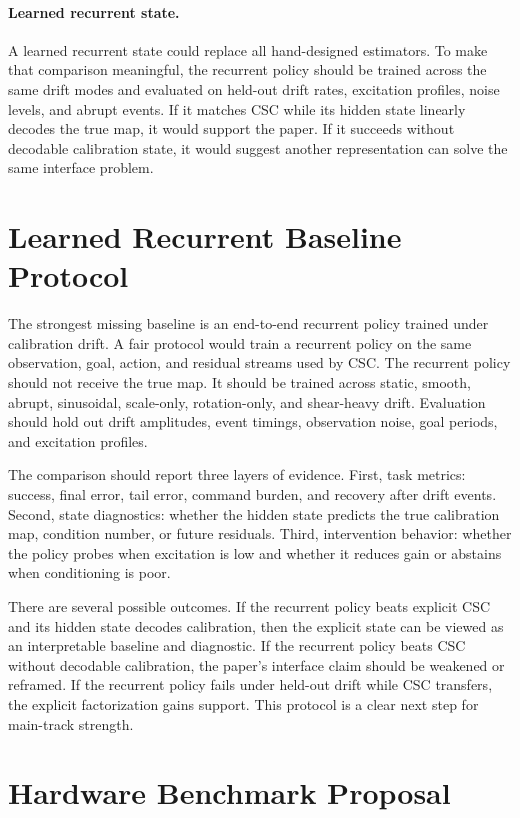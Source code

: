 \documentclass{article}
\begin{document}
\paragraph{Learned recurrent state.}
A learned recurrent state could replace all hand-designed estimators. To make
that comparison meaningful, the recurrent policy should be trained across the
same drift modes and evaluated on held-out drift rates, excitation profiles,
noise levels, and abrupt events. If it matches CSC while its hidden state
linearly decodes the true map, it would support the paper. If it succeeds
without decodable calibration state, it would suggest another representation
can solve the same interface problem.

\section{Learned Recurrent Baseline Protocol}

The strongest missing baseline is an end-to-end recurrent policy trained under
calibration drift. A fair protocol would train a recurrent policy on the same
observation, goal, action, and residual streams used by CSC. The recurrent
policy should not receive the true map. It should be trained across static,
smooth, abrupt, sinusoidal, scale-only, rotation-only, and shear-heavy drift.
Evaluation should hold out drift amplitudes, event timings, observation noise,
goal periods, and excitation profiles.

The comparison should report three layers of evidence. First, task metrics:
success, final error, tail error, command burden, and recovery after drift
events. Second, state diagnostics: whether the hidden state predicts the true
calibration map, condition number, or future residuals. Third, intervention
behavior: whether the policy probes when excitation is low and whether it
reduces gain or abstains when conditioning is poor.

There are several possible outcomes. If the recurrent policy beats explicit
CSC and its hidden state decodes calibration, then the explicit state can be
viewed as an interpretable baseline and diagnostic. If the recurrent policy
beats CSC without decodable calibration, the paper's interface claim should be
weakened or reframed. If the recurrent policy fails under held-out drift while
CSC transfers, the explicit factorization gains support. This protocol is a
clear next step for main-track strength.

\section{Hardware Benchmark Proposal}
\end{document}
